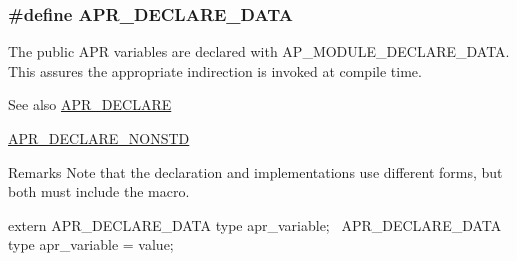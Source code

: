 \subsubsection[{\texorpdfstring{A\+P\+R\+\_\+\+D\+E\+C\+L\+A\+R\+E\+\_\+\+D\+A\+TA}{APR_DECLARE_DATA}}]{\setlength{\rightskip}{0pt plus 5cm}\#define A\+P\+R\+\_\+\+D\+E\+C\+L\+A\+R\+E\+\_\+\+D\+A\+TA}\hypertarget{group__apr__platform_ga16a1a3d65c57ce052fffb63190b1cadc}{}\label{group__apr__platform_ga16a1a3d65c57ce052fffb63190b1cadc}
The public A\+PR variables are declared with A\+P\+\_\+\+M\+O\+D\+U\+L\+E\+\_\+\+D\+E\+C\+L\+A\+R\+E\+\_\+\+D\+A\+TA. This assures the appropriate indirection is invoked at compile time. \begin{DoxySeeAlso}{See also}
\hyperlink{group__apr__platform_gad7b91b811a172bfa802603c2fb688f98}{A\+P\+R\+\_\+\+D\+E\+C\+L\+A\+RE} 

\hyperlink{group__apr__platform_ga3ad5e45fabbda0ec5f106c334f1a0ae5}{A\+P\+R\+\_\+\+D\+E\+C\+L\+A\+R\+E\+\_\+\+N\+O\+N\+S\+TD} 
\end{DoxySeeAlso}
\begin{DoxyRemark}{Remarks}
Note that the declaration and implementations use different forms, but both must include the macro.
\end{DoxyRemark}

\begin{DoxyPre}\end{DoxyPre}



\begin{DoxyPre}extern APR\_DECLARE\_DATA type apr\_variable;~\newline
APR\_DECLARE\_DATA type apr\_variable = value;\end{DoxyPre}



\begin{DoxyPre}\end{DoxyPre}
